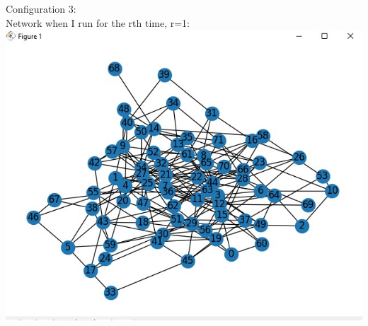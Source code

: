 \documentclass[answers]{exam}
\begin{document}
\begin{questions}
\begin{framed}
Configuration 3:\\Network when I run for the rth time, r=1:\\
\includegraphics[width=10 cm]{3rd conf 1.jpg}


\end{framed}
\end{questions}
\end{document}
